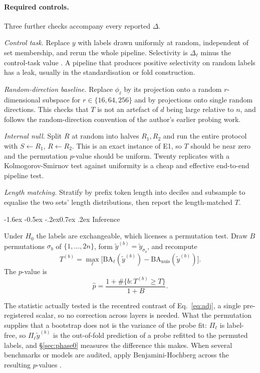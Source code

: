 \documentclass[10pt,twocolumn,letterpaper]{article}
\makeatletter
\renewcommand\subsection{\@startsection{subsection}{2}{\z@}%
  {-1.6ex \@plus -0.5ex \@minus -.2ex}{0.7ex \@plus .2ex}%
  {\normalfont\normalsize\bfseries}}
\newcommand{\BA}{\mathrm{BA}}
\newcommand{\nuis}{\mathrm{nuis}}
\makeatother
\begin{document}
\paragraph{Required controls.} Three further checks accompany every reported $\Delta$.

\emph{Control task.} Replace $y$ with labels drawn uniformly at random, independent of set membership, and rerun the whole pipeline. Selectivity is $\Delta_{\ell}$ minus the control-task value \cite{hewitt2019control}. A pipeline that produces positive selectivity on random labels has a leak, usually in the standardisation or fold construction.

\emph{Random-direction baseline.} Replace $\phi_\ell$ by its projection onto a random $r$-dimensional subspace for $r\in\{16,64,256\}$ and by projections onto single random directions. This checks that $T$ is not an artefact of $d$ being large relative to $n$, and follows the random-direction convention of the author's earlier probing work.

\emph{Internal null.} Split $R$ at random into halves $R_1,R_2$ and run the entire protocol with $S\!\leftarrow\!R_1$, $R\!\leftarrow\!R_2$. This is an exact instance of E1, so $T$ should be near zero and the permutation $p$-value should be uniform. Twenty replicates with a Kolmogorov-Smirnov test against uniformity is a cheap and effective end-to-end pipeline test.

\emph{Length matching.} Stratify by prefix token length into deciles and subsample to equalise the two sets' length distributions, then report the length-matched $T$.

\subsection{Inference}
\label{sec:inference}

Under $H_0$ the labels are exchangeable, which licenses a permutation test. Draw $B$ permutations $\sigma_b$ of $\{1,\dots,2n\}$, form $\tilde y^{(b)}=\tilde y_{\sigma_b}$, and recompute
\begin{equation}
T^{(b)} = \max_{\ell}\Big[\BA_\ell(\tilde y^{(b)}) - \BA_{\nuis}(\tilde y^{(b)})\Big].
\end{equation}
The $p$-value is
\begin{equation}
\hat p = \frac{1+\#\{b: T^{(b)}\ge T\}}{1+B}.
\end{equation}

The statistic actually tested is the recentred contrast of Eq.~\eqref{eq:adj}, a single pre-registered scalar, so no correction across layers is needed. What the permutation supplies that a bootstrap does not is the variance of the probe fit: $\Pi_\ell$ is label-free, so $\Pi_\ell\tilde y^{(b)}$ is the out-of-fold prediction of a probe refitted to the permuted labels, and \S\ref{sec:phase0} measures the difference this makes. When several benchmarks or models are audited, apply Benjamini-Hochberg across the resulting $p$-values \cite{benjamini1995fdr}.
\end{document}
